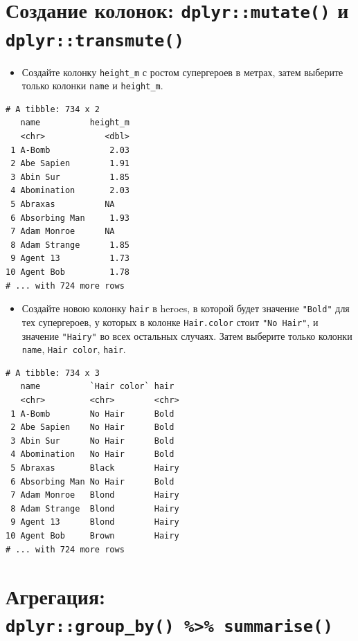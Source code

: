 \documentclass[
]{book}
\providecommand{\tightlist}{%
  \setlength{\itemsep}{0pt}\setlength{\parskip}{0pt}}
\begin{document}
\hypertarget{task_mutate}{%
\section{\texorpdfstring{Создание колонок: \texttt{dplyr::mutate()} и \texttt{dplyr::transmute()}}{Создание колонок: dplyr::mutate() и dplyr::transmute()}}\label{task_mutate}}

\begin{itemize}
\tightlist
\item
  Создайте колонку \texttt{height\_m} с ростом супергероев в метрах, затем выберите только колонки \texttt{name} и \texttt{height\_m}.
\end{itemize}

\begin{verbatim}
# A tibble: 734 x 2
   name          height_m
   <chr>            <dbl>
 1 A-Bomb            2.03
 2 Abe Sapien        1.91
 3 Abin Sur          1.85
 4 Abomination       2.03
 5 Abraxas          NA   
 6 Absorbing Man     1.93
 7 Adam Monroe      NA   
 8 Adam Strange      1.85
 9 Agent 13          1.73
10 Agent Bob         1.78
# ... with 724 more rows
\end{verbatim}

\begin{itemize}
\tightlist
\item
  Создайте новою колонку \texttt{hair} в heroes, в которой будет значение \texttt{"Bold"} для тех супергероев, у которых в колонке \texttt{Hair.color} стоит \texttt{"No\ Hair"}, и значение \texttt{"Hairy"} во всех остальных случаях. Затем выберите только колонки \texttt{name}, \texttt{Hair\ color}, \texttt{hair}.
\end{itemize}

\begin{verbatim}
# A tibble: 734 x 3
   name          `Hair color` hair 
   <chr>         <chr>        <chr>
 1 A-Bomb        No Hair      Bold 
 2 Abe Sapien    No Hair      Bold 
 3 Abin Sur      No Hair      Bold 
 4 Abomination   No Hair      Bold 
 5 Abraxas       Black        Hairy
 6 Absorbing Man No Hair      Bold 
 7 Adam Monroe   Blond        Hairy
 8 Adam Strange  Blond        Hairy
 9 Agent 13      Blond        Hairy
10 Agent Bob     Brown        Hairy
# ... with 724 more rows
\end{verbatim}

\hypertarget{task_group_by}{%
\section{\texorpdfstring{Агрегация: \texttt{dplyr::group\_by()\ \%\textgreater{}\%\ summarise()}}{Агрегация: dplyr::group\_by() \%\textgreater\% summarise()}}\label{task_group_by}}
\end{document}

